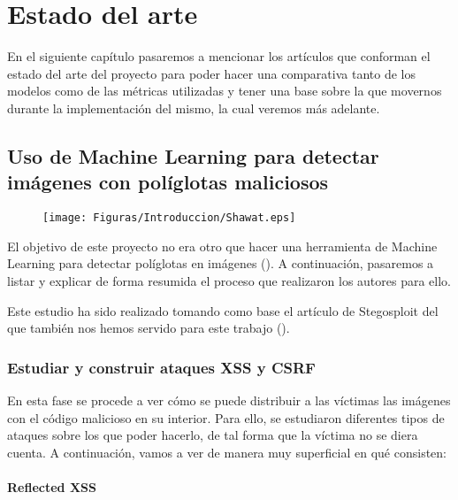 \chapter{Estado del arte}
\label{ch:sota}

En el siguiente capítulo pasaremos a mencionar los artículos que conforman el estado del arte del proyecto para poder hacer una comparativa tanto de los modelos como de las métricas utilizadas y tener una base sobre la que movernos durante la implementación del mismo, la cual veremos más adelante.

\section{Uso de Machine Learning para detectar imágenes con políglotas maliciosos}

\begin{figure}[h]
  \centering
  \texttt{[image: Figuras/Introduccion/Shawat.eps]}
  \caption{}
  \label{fig:diagrama_bloques}
\end{figure}

El objetivo de este proyecto no era otro que hacer una herramienta de Machine Learning para detectar políglotas en imágenes (\cite{ml-stenography-shawat}). A continuación, pasaremos a listar y explicar de forma resumida el proceso que realizaron los autores para ello. %

Este estudio ha sido realizado tomando como base el artículo de Stegosploit del que también nos hemos servido para este trabajo (\cite{stegosploit}). %

\subsection{Estudiar y construir ataques XSS y CSRF}

En esta fase se procede a ver cómo se puede distribuir a las víctimas las imágenes con el código malicioso en su interior. Para ello, se estudiaron diferentes tipos de ataques sobre los que poder hacerlo, de tal forma que la víctima no se diera cuenta. A continuación, vamos a ver de manera muy superficial en qué consisten:

\subsubsection{Reflected XSS}

